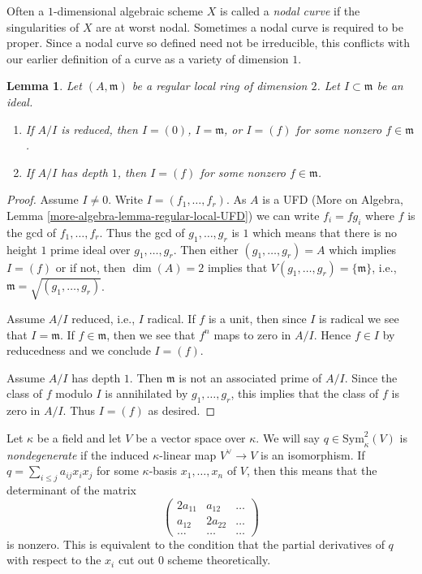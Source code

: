 \documentclass{stacks-project}
\theoremstyle{plain}
\newtheorem{lemma}[subsection]{Lemma}
\theoremstyle{definition}
\theoremstyle{remark}
\numberwithin{equation}{subsection}
\begin{document}
\noindent
Often a $1$-dimensional algebraic scheme $X$ is called a {\it nodal curve}
if the singularities of $X$ are at worst nodal. Sometimes a nodal curve
is required to be proper. Since a nodal curve
so defined need not be irreducible, this conflicts with our earlier definition
of a curve as a variety of dimension $1$.

\begin{lemma}
\label{lemma-reduced-quotient-regular-ring-dim-2}
Let $(A, \mathfrak m)$ be a regular local ring of dimension $2$.
Let $I \subset \mathfrak m$ be an ideal.
\begin{enumerate}
\item If $A/I$ is reduced, then $I = (0)$, $I = \mathfrak m$, or
$I = (f)$ for some nonzero $f \in \mathfrak m$.
\item If $A/I$ has depth $1$, then $I = (f)$ for some nonzero
$f \in \mathfrak m$. 
\end{enumerate}
\end{lemma}

\begin{proof}
Assume $I \not = 0$. Write $I = (f_1, \ldots, f_r)$. As $A$ is a UFD
(More on Algebra, Lemma \ref{more-algebra-lemma-regular-local-UFD})
we can write $f_i = fg_i$ where $f$ is the gcd of $f_1, \ldots, f_r$.
Thus the gcd of $g_1, \ldots, g_r$ is $1$ which means that
there is no height $1$ prime ideal over $g_1, \ldots, g_r$.
Then either $(g_1, \ldots, g_r) = A$ which implies $I = (f)$ or
if not, then $\dim(A) = 2$ implies that
$V(g_1, \ldots, g_r) = \{\mathfrak m\}$, i.e.,
$\mathfrak m = \sqrt{(g_1, \ldots, g_r)}$.

\medskip\noindent
Assume $A/I$ reduced, i.e., $I$ radical. If $f$ is a unit, then since $I$
is radical we see that $I = \mathfrak m$. If $f \in \mathfrak m$, then we
see that $f^n$ maps to zero in $A/I$. Hence $f \in I$ by reducedness and
we conclude $I = (f)$.

\medskip\noindent
Assume $A/I$ has depth $1$. Then $\mathfrak m$ is not an associated
prime of $A/I$. Since the class of $f$ modulo $I$ is annihilated
by $g_1, \ldots, g_r$, this implies that the class of $f$ is zero
in $A/I$. Thus $I = (f)$ as desired.
\end{proof}

\noindent
Let $\kappa$ be a field and let $V$ be a vector space over $\kappa$.
We will say $q \in \text{Sym}^2_\kappa(V)$ is {\it nondegenerate}
if the induced $\kappa$-linear map $V^\vee \to V$ is an
isomorphism. If $q = \sum_{i \leq j} a_{ij} x_i x_j$ for some
$\kappa$-basis $x_1, \ldots, x_n$ of $V$, then this means that
the determinant of the matrix
$$
\left(
\begin{matrix}
2a_{11} & a_{12} & \ldots \\
a_{12} & 2a_{22} & \ldots \\
\ldots & \ldots & \ldots
\end{matrix}
\right)
$$
is nonzero. This is equivalent to the condition that the
partial derivatives of $q$ with respect to the $x_i$ cut out
$0$ scheme theoretically.
\end{document}
